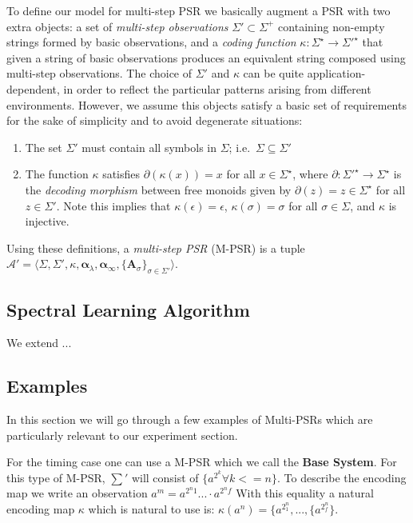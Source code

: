 \documentclass[letterpaper]{article}
\newcommand{\mat}[1]{\mathbf{#1}}
\newcommand{\A}{\mat{A}}
\newcommand{\aone}{\boldsymbol{\alpha}_\lambda}
\newcommand{\ainf}{\boldsymbol{\alpha}_{\infty}}
\newcommand{\psrA}{\mathcal{A}}
\newcommand{\mpsrsigma}{\langle \Sigma, \Sigma', \kappa, \aone, \ainf, \{\A_\sigma\}_{\sigma \in \Sigma'} \rangle}
\begin{document}
To define our model for multi-step PSR we basically augment a PSR with two extra objects: a set of \emph{multi-step observations} $\Sigma' \subset \Sigma^+$ containing non-empty strings formed by basic observations, and a \emph{coding function} $\kappa : \Sigma^\star \to {\Sigma'}^{\star}$ that given a string of basic observations produces an equivalent string composed using multi-step observations.
%
The choice of $\Sigma'$ and $\kappa$ can be quite application-dependent, in order to reflect the particular patterns arising from different environments. However, we assume this objects satisfy a basic set of requirements for the sake of simplicity and to avoid degenerate situations:
\begin{enumerate}
\item The set $\Sigma'$ must contain all symbols in $\Sigma$; i.e.\ $\Sigma \subseteq \Sigma'$
\item The function $\kappa$ satisfies $\partial(\kappa(x)) = x$ for all $x \in \Sigma^\star$, where $\partial : {\Sigma'}^\star \to \Sigma^\star$ is the \emph{decoding morphism} between free monoids given by $\partial(z) = z \in \Sigma^\star$ for all $z \in \Sigma'$. Note this implies that $\kappa(\epsilon) = \epsilon$, $\kappa(\sigma) = \sigma$ for all $\sigma \in \Sigma$, and $\kappa$ is injective.
\end{enumerate}

Using these definitions, a \emph{multi-step PSR} (M-PSR) is a tuple $\psrA' = \mpsrsigma$.

\subsection{Spectral Learning Algorithm}

We extend \cite{bootspsr}...

\subsection{Examples}


In this section we will go through a few examples of Multi-PSRs which are particularly relevant to our experiment section. 

For the timing case one can use a M-PSR which we call the \textbf{Base System}. For this type of M-PSR, $\sum'$ will consist of $\{a^{2^k} \forall k <= n\}$. To describe the encoding map we write an observation $a^m = a^{2^n1} ... \cdot a^{2^nf}$  With this equality a natural encoding map $\kappa$ which is natural to use is: $\kappa(a^n) = \{a^{2^n_1},...,\{a^{2^n_f}\}$. 
\end{document}

